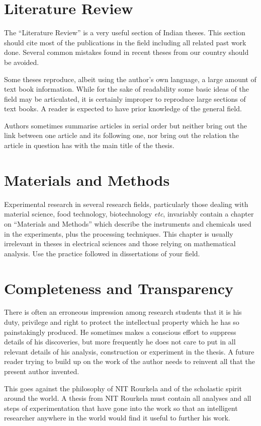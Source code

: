 \section{Literature Review} 
The ``Literature Review'' is a very useful section of Indian theses. This section should cite most of the publications in the field including all related past work done. Several common mistakes found in recent theses from our country should be avoided.
\par Some theses reproduce, albeit using the author's own language, a large amount of text book information. While for the sake of readability some basic ideas of the field may be articulated, it is certainly improper to reproduce large sections of text books. A reader is expected to have prior knowledge of the general field.
\par Authors sometimes summarise articles in serial order but neither bring out the link between one article and its following one, nor bring out the relation the article in question has with the main title of the thesis.

\section{Materials and Methods}
Experimental research in several research fields, particularly those dealing with material science, food technology, biotechnology \textit{etc}, invariably contain a chapter on “Materials and Methods” which describe the instruments and chemicals used in the experiments, plus the processing techniques. This chapter is usually irrelevant in theses in electrical sciences and those relying on mathematical analysis. Use the practice followed in dissertations of your field.

\section{Completeness and Transparency}
There is often an erroneous impression among research students that it is his duty, privilege and right to protect the intellectual property which he has so painstakingly produced. He sometimes makes a conscious effort to suppress details of his discoveries, but more frequently he does not care to put in all relevant details of his analysis, construction or experiment in the thesis. A future reader trying to build up on the work of the author needs to reinvent all that the present author invented.

\par This goes against the philosophy of NIT Rourkela and of the scholastic spirit around the world. A thesis from NIT Rourkela must contain all analyses and all steps of experimentation that have gone into the work so that an intelligent researcher anywhere in the world would find it useful to further his work.
